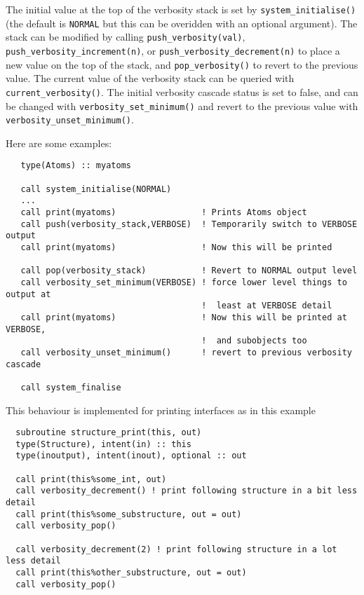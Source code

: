 The initial value at the top of the verbosity stack is set by
\texttt{system\_initialise()} (the default is \texttt{NORMAL} but this
can be overidden with an optional argument). The stack can be modified
by calling \texttt{push\_verbosity(val)}, \texttt{push\_verbosity\_increment(n)},
or \texttt{push\_verbosity\_decrement(n)} to place a new value on the top of the
stack, and \texttt{pop\_verbosity()} to revert to the previous value. 
The current value of the verbosity stack can be queried with 
\texttt{current\_verbosity()}.
The initial verbosity cascade status is set to false, and can be changed
with \texttt{verbosity\_set\_minimum()} and revert to the previous value
with \texttt{verbosity\_unset\_minimum()}.

Here are some examples:

\begin{boxedminipage}{\textwidth}
\begin{verbatim}
   type(Atoms) :: myatoms

   call system_initialise(NORMAL)
   ...
   call print(myatoms)                 ! Prints Atoms object
   call push(verbosity_stack,VERBOSE)  ! Temporarily switch to VERBOSE output
   call print(myatoms)                 ! Now this will be printed

   call pop(verbosity_stack)           ! Revert to NORMAL output level
   call verbosity_set_minimum(VERBOSE) ! force lower level things to output at 
                                       !  least at VERBOSE detail
   call print(myatoms)                 ! Now this will be printed at VERBOSE, 
                                       !  and subobjects too
   call verbosity_unset_minimum()      ! revert to previous verbosity cascade

   call system_finalise
\end{verbatim}
\end{boxedminipage}

This behaviour is implemented for printing interfaces as in this example

\begin{boxedminipage}{\textwidth}
\begin{verbatim}
  subroutine structure_print(this, out)
  type(Structure), intent(in) :: this
  type(inoutput), intent(inout), optional :: out

  call print(this%some_int, out)
  call verbosity_decrement() ! print following structure in a bit less detail
  call print(this%some_substructure, out = out)
  call verbosity_pop()

  call verbosity_decrement(2) ! print following structure in a lot less detail
  call print(this%other_substructure, out = out)
  call verbosity_pop()
\end{verbatim}
\end{boxedminipage}

